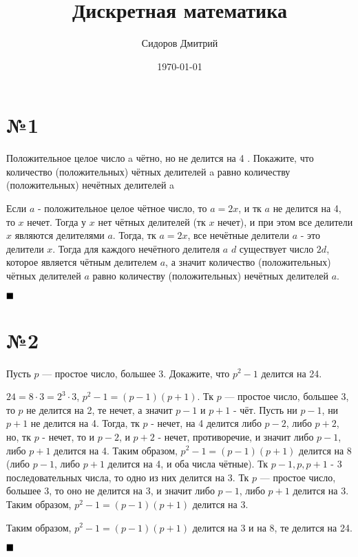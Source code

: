 \documentclass[a4paper, 16pt]{article}
\title{Дискретная математика}
\date{\today}
\author{Сидоров Дмитрий}
\affil{Группа БПМИ 219}
\newenvironment{proof}[1][Доказательство]{%
	\begin{trivlist}
		\item[\hskip \labelsep {\bfseries #1:}]
		\item \hspace{14pt}
	}{
		$ \hfill\blacksquare $
	\end{trivlist}
	\hfill\break
}
\begin{document}
	\maketitle
	
	\section*{№1}
	
		Положительное целое число
		a
		чётно, но не делится на
		4
		. Покажите, что количество (положительных)
		чётных делителей
		a
		равно количеству (положительных) нечётных делителей
		a
		
		\begin{proof}
			Если $a$ - положительное целое чётное число, то $a = 2x$, и тк $a$ не делится на 4, то $x$ нечет. Тогда у $x$ нет чётных делителей (тк $x$ нечет), и при этом все делители $x$ являются делителями $a$. Тогда, тк $a = 2x$, все нечётные делители $a$ - это делители $x$. Тогда для каждого нечётного делителя $a$ $d$ существует число $2d$, которое является чётным делителем $a$, а значит количество (положительных)
			чётных делителей
			$a$
			равно количеству (положительных) нечётных делителей
			$a$.
		\end{proof}
	
	\section*{№2}
		Пусть
		$p$
		— простое число, большее 3. Докажите, что
		$p^2-1$ делится на 24.
		
		\begin{proof}
			$24 = 8 \cdot 3 = 2^3 \cdot 3$, $p^2-1 = (p-1)(p+1)$. Тк $p$
			— простое число, большее 3, то $p$ не делится на 2, те нечет, а значит $p-1$ и $p+1$ - чёт. Пусть ни $p-1$, ни $p+1$ не делится на 4. Тогда, тк $p$ - нечет, на 4 делится либо $p-2$, либо $p + 2$, но, тк $p$ - нечет, то и $p-2$, и $p + 2$ - нечет, противоречие, и значит либо $p-1$, либо $p+1$ делится на 4. Таким образом, $p^2-1 = (p-1)(p+1)$ делится на 8 (либо $p-1$, либо $p+1$ делится на 4, и оба числа чётные). Тк $p-1, p, p+1$  - 3 последовательных числа, то одно из них делится на 3. Тк $p$
			— простое число, большее 3, то оно не делится на 3, и значит либо $p-1$, либо $p+1$ делится на 3. Таким образом, $p^2-1 = (p-1)(p+1)$ делится на 3.
			
			 Таким образом,  $p^2-1 = (p-1)(p+1)$ делится на 3 и на 8, те делится на 24.
		\end{proof}
	
\end{document}
